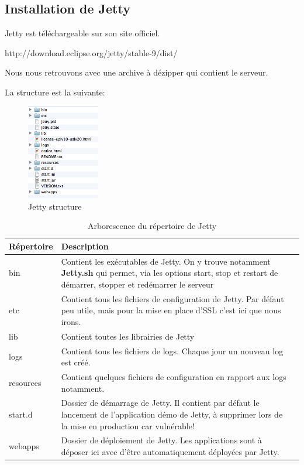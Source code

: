 \subsection{Installation de Jetty}
Jetty est téléchargeable sur son site officiel.

http://download.eclipse.org/jetty/stable-9/dist/

\medskip

Nous nous retrouvons avec une archive à dézipper qui contient le serveur.

\medskip

La structure est la suivante:
\begin{figure}[H]
    \begin{center}
        \centering \includegraphics[width=120px]{00_media/jetty_arb}
        \caption{Jetty structure}
    \end{center}
\end{figure}

\begin{table}[H]
\begin{tabularx}{\textwidth}{|m{3cm}|X|l|}
  \hline
  \bf{Répertoire} & \bf{Description} \\
  \hline
  bin & Contient les exécutables de Jetty. On y trouve notamment \textbf{Jetty.sh} qui permet, via les options start, stop et restart de démarrer, stopper et redémarrer le serveur \\
  \hline  
  etc & Contient tous les fichiers de configuration de Jetty. Par défaut peu utile, mais pour la mise en place d'SSL c'est ici que nous irons.\\
  \hline  
  lib & Contient toutes les librairies de Jetty\\
  \hline  
  logs & Contient tous les fichiers de logs. Chaque jour un nouveau log est créé. \\
  \hline  
  resources & Contient quelques fichiers de configuration en rapport aux logs notamment. \\
  \hline
  start.d & Dossier de démarrage de Jetty. Il contient par défaut le lancement de l'application démo de Jetty, à supprimer lors de la mise en production car vulnérable! \\
  \hline
  webapps & Dossier de déploiement de Jetty. Les applications sont à déposer ici avec d'être automatiquement déployées par Jetty. \\
  \hline
\end{tabularx}
\caption{Arborescence du répertoire de Jetty}
\label{tab:classDiagram}
\end{table}

